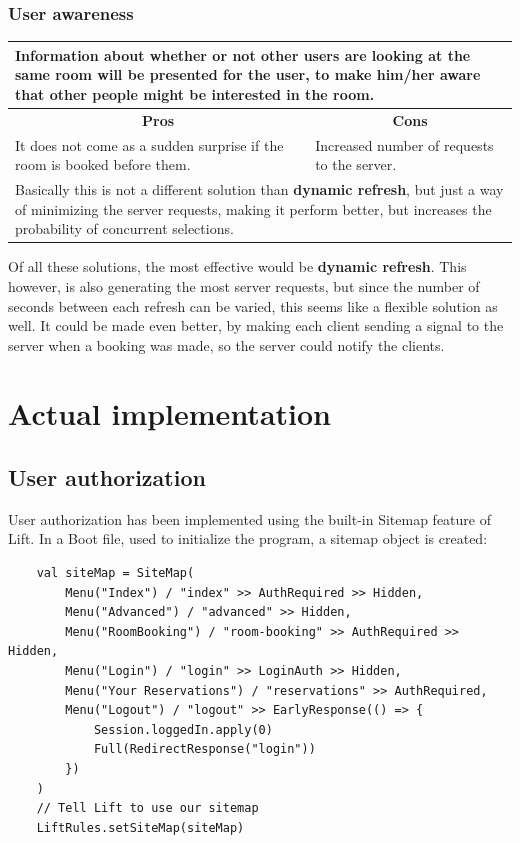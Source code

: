 \subsubsection*{User awareness}
\begin{tabular}{|p{6cm}|p{6cm}|}
\hline
	\multicolumn{2}{|p{12cm}|}{Information about whether or not other users are looking at the same room will be presented for the user, to make him/her aware that other people might be interested in the room. } \\ \hline \hline
	\multicolumn{1}{|c|}{\textbf{Pros}} & \multicolumn{1}{c|}{\textbf{Cons}} \\ \hline
	It does not come as a sudden surprise if the room is booked before them. & Increased number of requests to the server. \\ \hline
	\multicolumn{2}{|p{12cm}|}{Basically this is not a different solution than \textbf{dynamic refresh}, but just a way of minimizing the server requests, making it perform better, but increases the probability of concurrent selections.} \\
	\hline
\end{tabular}
\newline
Of all these solutions, the most effective would be \textbf{dynamic refresh}. This however, is also generating the most server requests, but since the number of seconds between each refresh can be varied, this seems like a flexible solution as well. It could be made even better, by making each client sending a signal to the server when a booking was made, so the server could notify the clients.\\

\section{Actual implementation}
\label{sec:actual_implementation}

\subsection{User authorization}
User authorization has been implemented using the built-in Sitemap feature of Lift. In a Boot file, used to initialize the program, a sitemap object is created:

\begin{verbatim}
    val siteMap = SiteMap(
        Menu("Index") / "index"	>> AuthRequired >> Hidden,
        Menu("Advanced") / "advanced" >> Hidden,
        Menu("RoomBooking") / "room-booking" >> AuthRequired >> Hidden,
        Menu("Login") / "login" >> LoginAuth >> Hidden,
        Menu("Your Reservations") / "reservations" >> AuthRequired,
        Menu("Logout") / "logout" >> EarlyResponse(() => {
            Session.loggedIn.apply(0)
            Full(RedirectResponse("login"))
        })
    )
    // Tell Lift to use our sitemap
    LiftRules.setSiteMap(siteMap)
\end{verbatim}

